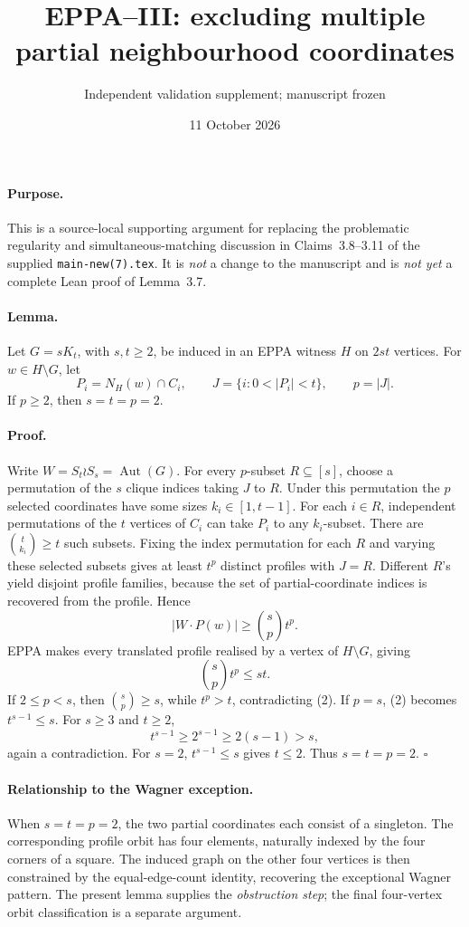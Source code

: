 \documentclass[11pt,a4paper]{article}
\title{EPPA--III: excluding multiple partial neighbourhood coordinates}
\author{Independent validation supplement; manuscript frozen}
\date{11 October 2026}
\begin{document}
\maketitle

\paragraph{Purpose.}
This is a source-local supporting argument for replacing the
problematic regularity and simultaneous-matching discussion in
Claims~3.8--3.11 of the supplied
\texttt{main-new(7).tex}. It is \emph{not} a change to the
manuscript and is \emph{not yet} a complete Lean proof of
Lemma~3.7.

\paragraph{Lemma.}
Let \(G=sK_t\), with \(s,t\ge2\), be induced in an
EPPA witness \(H\) on \(2st\) vertices.
For \(w\in H\setminus G\), let
\[
 P_i=N_H(w)\cap C_i,\qquad
 J=\{i:0<|P_i|<t\},\qquad p=|J|.
\]
If \(p\ge2\), then \(s=t=p=2\).

\paragraph{Proof.}
Write \(W=S_t\wr S_s=\operatorname{Aut}(G)\).
For every \(p\)-subset \(R\subseteq[s]\), choose a
permutation of the \(s\) clique indices taking \(J\)
to \(R\). Under this permutation the \(p\) selected
coordinates have some sizes \(k_i\in[1,t-1]\).
For each \(i\in R\), independent permutations of
the \(t\) vertices of \(C_i\) can take \(P_i\)
to any \(k_i\)-subset. There are
\(\binom{t}{k_i}\ge t\) such subsets.
Fixing the index permutation for each \(R\)
and varying these selected subsets gives at least
\(t^p\) distinct profiles with \(J=R\).
Different \(R\)'s yield disjoint profile families,
because the set of partial-coordinate indices is
recovered from the profile. Hence
\[
       |W\cdot P(w)|\ge\binom{s}{p}t^p. \tag{1}
\]
EPPA makes every translated profile realised by
a vertex of \(H\setminus G\), giving
\[
       \binom{s}{p}t^p\le st. \tag{2}
\]
If \(2\le p<s\), then
\(\binom{s}{p}\ge s\), while
\(t^p>t\), contradicting (2).
If \(p=s\), (2) becomes \(t^{s-1}\le s\).
For \(s\ge3\) and \(t\ge2\),
\[
 t^{s-1}\ge 2^{s-1}\ge 2(s-1)>s,
\]
again a contradiction. For \(s=2\),
\(t^{s-1}\le s\) gives \(t\le2\).
Thus \(s=t=p=2\). \(\square\)

\paragraph{Relationship to the Wagner exception.}
When \(s=t=p=2\), the two partial coordinates
each consist of a singleton. The corresponding
profile orbit has four elements, naturally indexed
by the four corners of a square.
The induced graph on the other four vertices
is then constrained by the equal-edge-count
identity, recovering the exceptional Wagner
pattern. The present lemma supplies the
\emph{obstruction step}; the final four-vertex
orbit classification is a separate argument.
\end{document}
